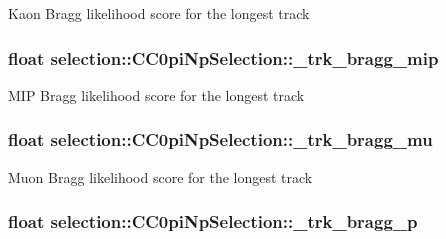 Kaon Bragg likelihood score for the longest track \hypertarget{classselection_1_1CC0piNpSelection_aec1e4d27216773ec40bc66ab5c217abc}{
\subsubsection[{\-\_\-trk\-\_\-bragg\-\_\-mip}]{\setlength{\rightskip}{0pt plus 5cm}float selection\-::\-C\-C0pi\-Np\-Selection\-::\-\_\-trk\-\_\-bragg\-\_\-mip\hspace{0.3cm}{\ttfamily [private]}}}\label{classselection_1_1CC0piNpSelection_aec1e4d27216773ec40bc66ab5c217abc}
M\-I\-P Bragg likelihood score for the longest track \hypertarget{classselection_1_1CC0piNpSelection_a9e7b081beb0ef9129f15a7fb965276f1}{
\subsubsection[{\-\_\-trk\-\_\-bragg\-\_\-mu}]{\setlength{\rightskip}{0pt plus 5cm}float selection\-::\-C\-C0pi\-Np\-Selection\-::\-\_\-trk\-\_\-bragg\-\_\-mu\hspace{0.3cm}{\ttfamily [private]}}}\label{classselection_1_1CC0piNpSelection_a9e7b081beb0ef9129f15a7fb965276f1}
Muon Bragg likelihood score for the longest track \hypertarget{classselection_1_1CC0piNpSelection_a52d578481ee7dd4fed45f8e3c8ed44da}{
\subsubsection[{\-\_\-trk\-\_\-bragg\-\_\-p}]{\setlength{\rightskip}{0pt plus 5cm}float selection\-::\-C\-C0pi\-Np\-Selection\-::\-\_\-trk\-\_\-bragg\-\_\-p\hspace{0.3cm}{\ttfamily [private]}}}\label{classselection_1_1CC0piNpSelection_a52d578481ee7dd4fed45f8e3c8ed44da}
